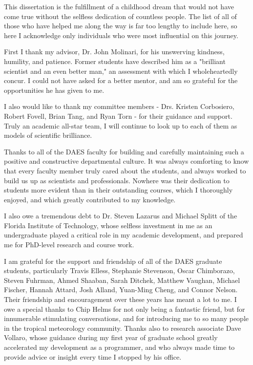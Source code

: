  


\indent \indent This dissertation is the fulfillment of a childhood dream that would not have come true without the selfless dedication of countless people.
The list of all of those who have helped me along the way is far too lengthy to include here, so here I acknowledge only individuals who were most influential on this journey.

First I thank my advisor, Dr. John Molinari, for his unswerving kindness, humility, and patience.  
Former students have described him as a "brilliant scientist and an even better man," an assessment with which I wholeheartedly concur.  
I could not have asked for a better mentor, and am so grateful for the opportunities he has given to me.

I also would like to thank my committee members - Drs. Kristen Corbosiero, Robert Fovell, Brian Tang, and Ryan Torn - for their guidance and support.  
Truly an academic all-star team, I will continue to look up to each of them as models of scientific brilliance.

Thanks to all of the DAES faculty for building and carefully maintaining such a positive and constructive departmental culture.  
It was always comforting to know that every faculty member truly cared about the students, and always worked to build us up as scientists and professionals.  
Nowhere was their dedication to students more evident than in their outstanding courses, which I thoroughly enjoyed, and which greatly contributed to my knowledge.  

I also owe a tremendous debt to Dr. Steven Lazarus and Michael Splitt of the Florida Institute of Technology, whose selfless investment in me as an undergraduate played a critical role in my academic development, and prepared me for PhD-level research and course work.

I am grateful for the support and friendship of all of the DAES graduate students, particularly Travis Elless, Stephanie Stevenson, Oscar Chimborazo, Steven Fuhrman, Ahmed Shaaban, Sarah Ditchek, Matthew Vaughan, Michael Fischer, Hannah Attard, Josh Alland, Yuan-Ming Cheng, and Connor Nelson.  
Their friendship and encouragement over these years has meant a lot to me.
I owe a special thanks to Chip Helms for not only being a fantastic friend, but for innumerable stimulating conversations, and for introducing me to so many people in the tropical meteorology community.  
Thanks also to research associate Dave Vollaro, whose guidance during my first year of graduate school greatly accelerated my development as a programmer, and who always made time to provide advice or insight every time I stopped by his office.

